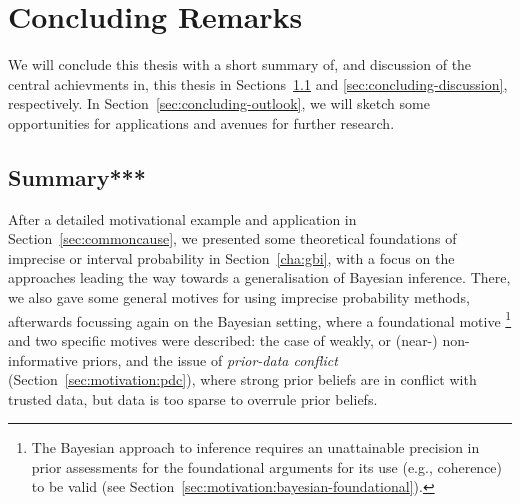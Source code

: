 \chapter{Concluding Remarks}
\label{cha:concluding}

We will conclude this thesis with a short summary of, and discussion of the central achievments in, this thesis
in Sections~\ref{sec:concluding-summary} and \ref{sec:concluding-discussion}, respectively.
In Section~\ref{sec:concluding-outlook}, we will sketch some opportunities for applications and avenues for further research.


\section{Summary***}
\label{sec:concluding-summary}


After a detailed motivational example and application in Section~\ref{sec:commoncause},
we presented some theoretical foundations of imprecise or interval probability in Section~\ref{cha:gbi},
with a focus on the approaches leading the way towards a generalisation of Bayesian inference.
There, we also gave some general motives for using imprecise probability methods,
afterwards focussing again on the Bayesian setting, where a foundational motive%
\footnote{The Bayesian approach to inference
requires an unattainable precision in prior assessments
for the foundational arguments for its use (e.g., coherence) to be valid
(see Section~\ref{sec:motivation:bayesian-foundational}).}
and two specific motives were described:
the case of weakly, or (near-) non-informative priors,
and the issue of \emph{prior-data conflict} (Section~\ref{sec:motivation:pdc}),
where strong prior beliefs are in conflict with trusted data,
but data is too sparse to overrule prior beliefs.

